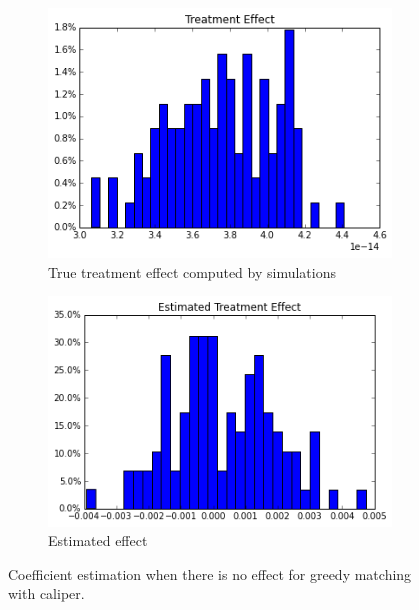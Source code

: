 \documentclass[11pt]{article}
\begin{document}
\begin{figure}[h]
\centering
\begin{subfigure}{.5\textwidth}
  \centering
  \includegraphics[width=.9\linewidth]{treatment_effect_no_influence_real.png}
  \caption{True treatment effect computed by simulations}
  \label{fig:sub1}
\end{subfigure}%
\begin{subfigure}{.5\textwidth}
  \centering
  \includegraphics[width=.9\linewidth]{estimated_no_influence.png}
  \caption{Estimated effect}
  \label{fig:sub2}
\end{subfigure}
\caption{Coefficient estimation when there is no effect for greedy matching with caliper.}
\label{fig:no_effect_gps}
\end{figure}
\end{document}
